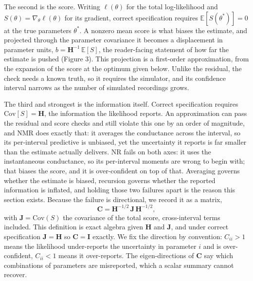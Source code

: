 The second is the score. Writing $\ell(\theta)$ for the total log-likelihood and $S(\theta)=\nabla_\theta\ell(\theta)$ for its gradient, correct specification requires $\mathbb{E}[S(\theta^\ast)]=0$ at the true parameters $\theta^\ast$. A nonzero mean score is what biases the estimate, and projected through the parameter covariance it becomes a displacement in parameter units, $b=\mathbf{H}^{-1}\,\mathbb{E}[S]$, the reader-facing statement of how far the estimate is pushed (Figure 3). This projection is a first-order approximation, from the expansion of the score at the optimum given below. Unlike the residual, the check needs a known truth, so it requires the simulator, and its confidence interval narrows as the number of simulated recordings grows.

The third and strongest is the information itself. Correct specification requires $\mathrm{Cov}[S]=\mathbf{H}$, the information the likelihood reports. An approximation can pass the residual and score checks and still violate this one by an order of magnitude, and NMR does exactly that: it averages the conductance across the interval, so its per-interval predictive is unbiased, yet the uncertainty it reports is far smaller than the estimate actually delivers. NR fails on both axes: it uses the instantaneous conductance, so its per-interval moments are wrong to begin with; that biases the score, and it is over-confident on top of that. Averaging governs whether the estimate is biased, recursion governs whether the reported information is inflated, and holding those two failures apart is the reason this section exists. Because the failure is directional, we record it as a matrix,
\[ \mathbf{C}=\mathbf{H}^{-1/2}\,\mathbf{J}\,\mathbf{H}^{-1/2}, \]
with $\mathbf{J}=\mathrm{Cov}(S)$ the covariance of the total score, cross-interval terms included. This definition is exact algebra given $\mathbf{H}$ and $\mathbf{J}$, and under correct specification $\mathbf{J}=\mathbf{H}$ so $\mathbf{C}=\mathbf{I}$ exactly. We fix the direction by convention: $C_{ii}>1$ means the likelihood under-reports the uncertainty in parameter $i$ and is over-confident, $C_{ii}<1$ means it over-reports. The eigen-directions of $\mathbf{C}$ say which combinations of parameters are misreported, which a scalar summary cannot recover.


